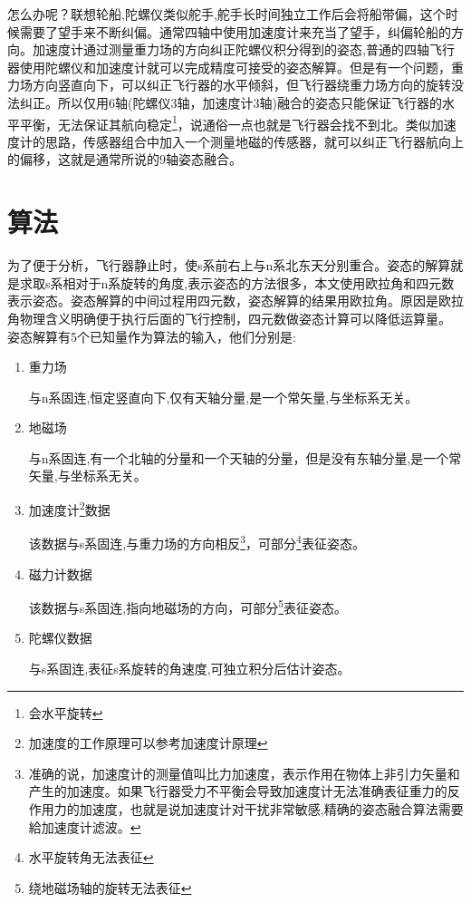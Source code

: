 \documentclass[12pt,a4paper]{article}
\begin{document}
怎么办呢？\cite{9轴融合论文}联想轮船,陀螺仪类似舵手,舵手长时间独立工作后会将船带偏，这个时候需要了望手来不断纠偏。通常四轴中使用加速度计来充当了望手，纠偏轮船的方向。加速度计通过测量重力场的方向纠正陀螺仪积分得到的姿态,普通的四轴飞行器使用陀螺仪和加速度计就可以完成精度可接受的姿态解算。但是有一个问题，重力场方向竖直向下，可以纠正飞行器的水平倾斜，但飞行器绕重力场方向的旋转没法纠正。所以仅用6轴(陀螺仪3轴，加速度计3轴)融合的姿态只能保证飞行器的水平平衡，无法保证其航向稳定\footnote{会水平旋转}，说通俗一点也就是飞行器会找不到北。类似加速度计的思路，传感器组合中加入一个测量地磁的传感器\cite{经典博客}，就可以纠正飞行器航向上的偏移，这就是通常所说的9轴姿态融合。

\section{算法}
为了便于分析，飞行器静止时，使s系前右上与n系北东天分别重合。姿态的解算就是求取s系相对于n系旋转的角度,表示姿态的方法很多，本文使用欧拉角和四元数表示姿态。姿态解算的中间过程用四元数，姿态解算的结果用欧拉角。原因是欧拉角物理含义明确便于执行后面的飞行控制，四元数做姿态计算可以降低运算量。
姿态解算有5个已知量作为算法的输入，他们分别是:
\begin{enumerate}
    \item 重力场

        与n系固连,恒定竖直向下,仅有天轴分量,是一个常矢量,与坐标系无关。
    \item 地磁场

        与n系固连,有一个北轴的分量和一个天轴的分量，但是没有东轴分量,是一个常矢量,与坐标系无关。
    \item 加速度计\footnote{加速度的工作原理可以参考加速度计原理\cite{加速度计原理}}数据

        该数据与s系固连,与重力场的方向相反\footnote{准确的说，加速度计的测量值叫比力加速度，表示作用在物体上非引力矢量和产生的加速度。如果飞行器受力不平衡会导致加速度计无法准确表征重力的反作用力的加速度，也就是说加速度计对干扰非常敏感,精确的姿态融合算法需要給加速度计滤波。}，可部分\footnote{水平旋转角无法表征}表征姿态。
    \item 磁力计数据

        该数据与s系固连,指向地磁场的方向，可部分\footnote{绕地磁场轴的旋转无法表征}表征姿态。
    \item 陀螺仪数据

        与s系固连,表征s系旋转的角速度,可独立积分后估计姿态。
\end{enumerate}
\end{document}
